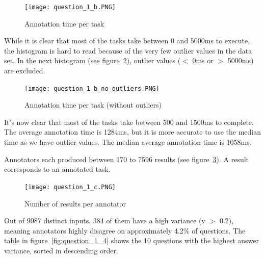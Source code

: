 \documentclass[letterpaper,12pt]{article}
\begin{document}
\renewcommand\thefigure{4}
\begin{figure}[hb] 
        \centering \texttt{[image: question\_1\_b.PNG]}
        \caption{
                \label{fig:question_1_b}
                Annotation time per task
        }
\end{figure}

While it is clear that most of the tasks take between 0 and 5000ms to execute, the histogram is hard to read because of the very few outlier values in the data set. In the next histogram (see figure~\ref{fig:question_1_b_no_outliers}), outlier values ($<$ 0ms or $>$ 5000ms) are excluded.

\newpage
\renewcommand\thefigure{5}
\begin{figure}[hb] 
        \centering \texttt{[image: question\_1\_b\_no\_outliers.PNG]}
        \caption{
                \label{fig:question_1_b_no_outliers}
                Annotation time per task (without outliers)
        }
\end{figure}

It's now clear that most of the tasks take between 500 and 1500ms to complete. The average annotation time is 1284ms, but it is more accurate to use the median time as we have outlier values. The median average annotation time is 1058ms.

\newpage
Annotators each produced between 170 to 7596 results (see figure~\ref{fig:question_1_c}). A result corresponds to an annotated task.

\renewcommand\thefigure{6}
\begin{figure}[hb] 
        \centering \texttt{[image: question\_1\_c.PNG]}
        \caption{
                \label{fig:question_1_c}
                Number of results per annotator
        }
\end{figure}

\newpage
Out of 9087 distinct inputs, 384 of them have a high variance (v $>$ 0.2), meaning annotators highly disagree on approximately 4.2\% of questions. The table in figure~\ref{fig:question_1_4} shows the 10 questions with the highest answer variance, sorted in descending order.
\end{document}
